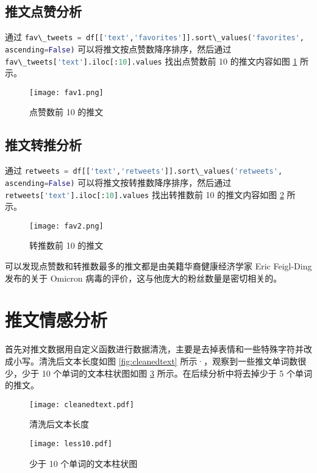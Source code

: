\documentclass[12pt,AutoFakeBold]{article}
\begin{document}
\subsection{推文点赞分析}

通过 \lstinline[language=Python]|fav\_tweets = df[['text','favorites']].sort\_values('favorites', ascending=False)| 可以将推文按点赞数降序排序，然后通过 \lstinline[language=Python]|fav\_tweets['text'].iloc[:10].values| 找出点赞数前 10 的推文内容如图 \ref{fig:fav1} 所示。

\begin{figure}[htbp]
	\centering
    \texttt{[image: fav1.png]}
    \caption{点赞数前 10 的推文} \label{fig:fav1}
\end{figure}

\subsection{推文转推分析}

通过 \lstinline[language=Python]|retweets = df[['text','retweets']].sort\_values('retweets', ascending=False)| 可以将推文按转推数降序排序，然后通过 \lstinline[language=Python]|retweets['text'].iloc[:10].values| 找出转推数前 10 的推文内容如图 \ref{fig:fav2} 所示。

\begin{figure}[htbp]
	\centering
    \texttt{[image: fav2.png]}
    \caption{转推数前 10 的推文} \label{fig:fav2}
\end{figure}

可以发现点赞数和转推数最多的推文都是由美籍华裔健康经济学家 Eric Feigl-Ding 发布的关于 Omicron 病毒的评价，这与他庞大的粉丝数量是密切相关的。

\section{推文情感分析}

首先对推文数据用自定义函数进行数据清洗，主要是去掉表情和一些特殊字符并改成小写。清洗后文本长度如图 \ref{fig:cleanedtext} 所示·，观察到一些推文单词数很少，少于 10 个单词的文本柱状图如图 \ref{fig:less10} 所示。在后续分析中将去掉少于 5 个单词的推文。

\begin{figure}[htbp]
	\centering
	\begin{minipage}[t]{0.48\textwidth}
		\centering
		\texttt{[image: cleanedtext.pdf]}
		\caption{清洗后文本长度} \label{fig:cleanedtext}
	\end{minipage}
	\begin{minipage}[t]{0.48\textwidth}
		\centering
		\texttt{[image: less10.pdf]}
		\caption{少于 10 个单词的文本柱状图} \label{fig:less10}
	\end{minipage}
\end{figure}
\end{document}
